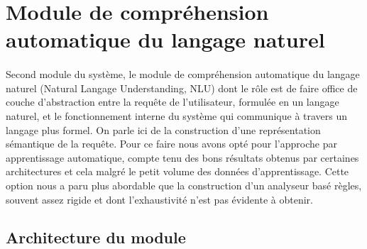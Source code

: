 \section{Module de compréhension automatique du langage naturel}
\paragraph{}
Second module du système, le module de compréhension automatique du langage naturel (Natural Langage Understanding, NLU) dont le rôle est de faire office de couche d'abstraction entre la requête de l'utilisateur, formulée en un langage naturel, et le fonctionnement interne du système qui communique à travers un langage plus formel. On parle ici de la construction d'une représentation sémantique de la requête. Pour ce faire nous avons opté pour l'approche par apprentissage automatique, compte tenu des bons résultats obtenus par certaines architectures \citep{intent_slots,intent_classification} et cela malgré le petit volume des données d'apprentissage. Cette option nous a paru plus abordable que la construction d'un analyseur basé règles, souvent assez rigide et dont l'exhaustivité n'est pas évidente à obtenir.
	\subsection{Architecture du module}
